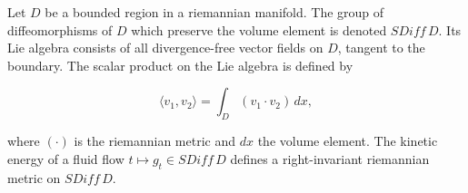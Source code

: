 Let $D$ be a bounded region in a riemannian manifold. The group of diffeomorphisms of $D$ which preserve the volume element is denoted $SDiff\,D$. Its Lie algebra consists of all divergence-free vector fields on $D$, tangent to the boundary. The scalar product on the Lie algebra is defined by

$$\langle v_1, v_2 \rangle = \int_D (v_1 \cdot v_2)\, dx,$$

where $(\cdot)$ is the riemannian metric and $dx$ the volume element. The kinetic energy of a fluid flow $t \mapsto g_t \in SDiff\,D$ defines a right-invariant riemannian metric on $SDiff\,D$.
